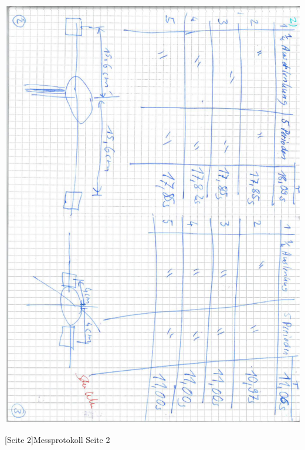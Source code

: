 \documentclass[12pt,a4paper,]{scrreprt}
\begin{document}
        \begin{center}
    		\includegraphics[scale=0.7]{2.pdf}
    	\end{center}
    	[Seite 2]{Messprotokoll Seite 2}
    	\pagebreak
    	
\end{document}

